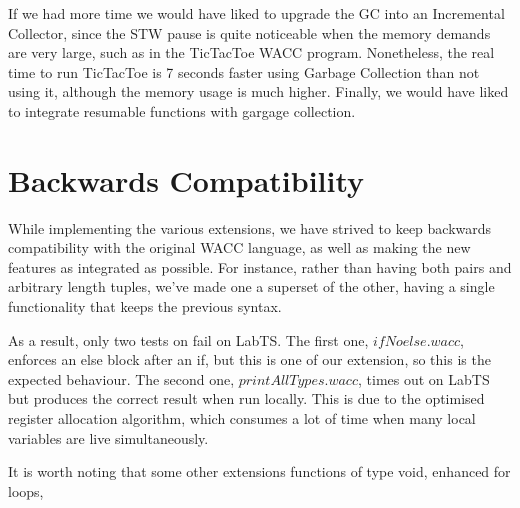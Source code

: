 \documentclass{article}
\begin{document}
If we had more time we would have liked to upgrade the GC into an Incremental Collector, since the STW pause is quite noticeable when the memory demands are very large, such as in the TicTacToe WACC program. Nonetheless, the real time to run TicTacToe is 7 seconds faster using Garbage Collection than not using it, although the memory usage is much higher. Finally, we would have liked to integrate resumable functions with gargage collection. 




\section{Backwards Compatibility}
While implementing the various extensions, we have strived to keep backwards compatibility with the original WACC language,
as well as making the new features as integrated as possible. For instance, rather than having both pairs and arbitrary length
tuples, we've made one a superset of the other, having a single functionality that keeps the previous syntax.

As a result, only two tests on fail on LabTS. The first one, $ifNoelse.wacc$, enforces an else block after an if, but this
is one of our extension, so this is the expected behaviour. The second one, $printAllTypes.wacc$, times out on LabTS but
produces the correct result when run locally. This is due to the optimised register allocation algorithm, which consumes a
lot of time when many local variables are live simultaneously.

It is worth noting that some other extensions functions of type void, enhanced for loops, 
\end{document}
